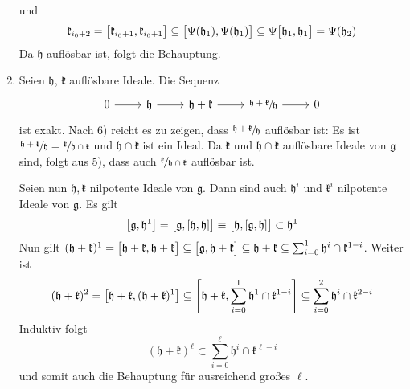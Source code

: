 \begin{beweis}
\begin{enumerate}[1),itemsep=0pt]
\[		\]
		und 
		\[
			\mathfrak{k}_{i_0+2} = \benbrace[\big]{\mathfrak{k}_{i_0 +1}, \mathfrak{k}_{i_0 +1}} \subseteq \benbrace[\big]{\Psi(\mathfrak{h}_1), \Psi(\mathfrak{h}_1)} \subseteq \Psi \benbrace[\big]{\mathfrak{h}_1, \mathfrak{h}_1} = \Psi(\mathfrak{h}_2)
		\]
		Da $\mathfrak{h}$ auflösbar ist, folgt die Behauptung.
		\item Seien $\mathfrak{h}$, $\mathfrak{k}$ auflösbare Ideale.
		Die Sequenz
		\[
			\begin{tikzcd}
				0 \rar & \mathfrak{h} \rar & \mathfrak{h} + \mathfrak{k} \rar & \sfrac{\mathfrak{h} + \mathfrak{k}}{\mathfrak{h}} \rar & 0
			\end{tikzcd}
		\]
		ist exakt.
		Nach 6) reicht es zu zeigen, dass $\sfrac{\mathfrak{h} + \mathfrak{k}}{\mathfrak{h}}$ auflösbar ist: 
		Es ist $\sfrac{\mathfrak{h}+ \mathfrak{k}}{\mathfrak{h}} = \sfrac{\mathfrak{k}}{\mathfrak{h} \cap \mathfrak{k}}$ und $\mathfrak{h} \cap \mathfrak{k}$ ist ein Ideal.
		Da $\mathfrak{k}$ und $\mathfrak{h} \cap \mathfrak{k}$ auflösbare Ideale von $\mathfrak{g}$ sind, folgt aus 5), dass auch $\sfrac{\mathfrak{k}}{\mathfrak{h} \cap \mathfrak{k}}$ auflösbar ist.
		
		Seien nun $\mathfrak{h}, \mathfrak{k}$ nilpotente Ideale von $\mathfrak{g}$.
		Dann sind auch $\mathfrak{h}^i$ und $\mathfrak{k}^i$ nilpotente Ideale von $\mathfrak{g}$.
		Es gilt
		\[
			\benbrace*{\mathfrak{g}, \mathfrak{h}^1} = \benbrace[\big]{\mathfrak{g}, \benbrace*{\mathfrak{h}, \mathfrak{h}}} \equiv \benbrace[\big]{\mathfrak{h}, \benbrace*{\mathfrak{g},\mathfrak{h}}} \subset \mathfrak{h}^1
		\]
		Nun gilt 
		\(
			(\mathfrak{h} + \mathfrak{k})^1 = \benbrace[\big]{\mathfrak{h} + \mathfrak{k}, \mathfrak{h} + \mathfrak{k}} \subseteq \benbrace[\big]{\mathfrak{g},\mathfrak{h} + \mathfrak{k}} \subseteq \mathfrak{h} + \mathfrak{k} \subseteq \sum_{i=0}^{1} \mathfrak{h}^i \cap \mathfrak{k}^{1-i}
		\).
		Weiter ist 
		\[
			(\mathfrak{h} + \mathfrak{k})^2 = \benbrace*{\mathfrak{h} + \mathfrak{k},(\mathfrak{h} + \mathfrak{k})^1} \subseteq \benbrace*{\mathfrak{h} + \mathfrak{k}, \sum_{i=0}^{1} \mathfrak{h}^1 \cap \mathfrak{k}^{1-i} } \subseteq \sum_{i=0}^{2} \mathfrak{h}^i \cap \mathfrak{k}^{2-i}
		\]
		Induktiv folgt
		\[
			(\mathfrak{h} + \mathfrak{k})^\ell \subset \sum_{i=0}^{\ell} \mathfrak{h}^i \cap \mathfrak{k}^{\ell-i}
		\]
		und somit auch die Behauptung für ausreichend großes $\ell$.\qedhere
	\end{enumerate}
\end{beweis}

